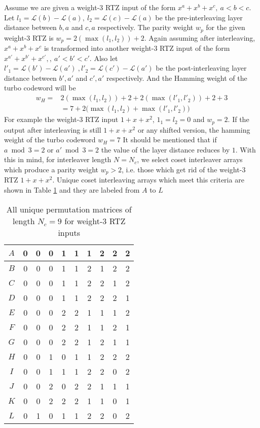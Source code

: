 \documentclass[11pt, oneside, dvipdfmx]{book}
\begin{document}
 Assume we are given a weight-$3$ RTZ input of the form $x^a+x^b+x^c,~a<b<c$. Let $l_1 =\mathcal{L}(b) - \mathcal{L}(a) ,~l_2=\mathcal{L}(c) - \mathcal{L}(a)$ be the pre-interleaving layer distance between $b,a$ and $c,a$ respectively. The parity weight $w_p$ for the given weight-$3$ RTZ is $w_p=2 (\max(l_1,l_2))+2$.
 Again assuming after interleaving, $x^a+x^b+x^c$ is transformed into another weight-$3$ RTZ input of the form $x^{a'}+x^{b'}+x^{c'},,~a'<b'<c'$. Also let $l'_1= \mathcal{L}(b') - \mathcal{L}(a')~,l'_2=\mathcal{L}(c') - \mathcal{L}(a')$ be the post-interleaving layer distance between $b',a'$ and $c',a'$ respectively.
 And the Hamming weight of the turbo codeword will be 
 \begin{equation}
 \begin{split}
 w_H =& 2 (\max(l_1,l_2))+2 + 2 (\max(l'_1,l'_2))+2 +3\\
 &=7+2 \Big(\max(l_1,l_2) + \max(l'_1,l'_2) \Big)
 \end{split}
 \label{eq4}
 \end{equation}
For example the weight-$3$ RTZ input $1+x+x^2$, $1_1=l_2=0$ and $w_p=2$.
If the output after interleaving is still $1+x+x^2$ or any shifted version, the hamming weight of the turbo codeword $w_H=7$
It should be mentioned that if $a \bmod 3=2$ or $a' \bmod 3 = 2$ the value of the layer distance reduces by $1$.
With this in mind, for interleaver length $N=N_c$, we select coset interleaver arrays which produce a parity weight $w_p>2$, i.e. those which get rid of the weight-$3$ RTZ $1+x+x^2$. Unique coset interleaving arrays which meet this criteria are shown in Table \ref{tb2} and they are labeled from $A$ to $L$

\begin{table}[h!]
\centering
\begin{tabular}{|c || c  c  c  c  c  c  c  c  c |} 
 \hline
 $A$ & 0 & 0 & 0 & 1 & 1 & 1 & 2 & 2 & 2\\ 
  \hline
 $B$ & 0 & 0 & 0 & 1 & 1 & 2 & 1 & 2 & 2\\ 
 \hline
$C$ & 0 & 0 & 0 & 1 & 1 & 2 & 2 & 1 & 2\\ 
 \hline
$D$ & 0 & 0 & 0 & 1 & 1 & 2 & 2 & 2 & 1\\ 
 \hline
 $E$ & 0 & 0 & 0 & 2 & 2 & 1 & 1 & 1 & 2\\ 
 \hline
 $F$ & 0 & 0 & 0 & 2 & 2 & 1 & 1 & 2 & 1\\ 
 \hline
 $G$ & 0 & 0 & 0 & 2 & 2 & 1 & 2 & 1 & 1\\ 
 \hline
  $H$ & 0 & 0 & 1 & 0 & 1 & 1 & 2 & 2 & 2\\ 
 \hline
  $I$ & 0 & 0 & 1 & 1 & 1 & 2 & 2 & 0 & 2\\ 
 \hline
 $J$ & 0 & 0 & 2 & 0 & 2 & 2 & 1 & 1 & 1\\ 
 \hline
  $K$ & 0 & 0 & 2 & 2 & 2 & 1 & 1 & 0 & 1\\ 
 \hline
  $L$ & 0 & 1 & 0 & 1 & 1 & 2 & 2 & 0 & 2\\ 
 \hline
\end{tabular}
\caption{All unique permutation matrices of length $N_c =9$ for weight-$3$ RTZ inputs}
\label{tb2}
\end{table}
\end{document}
